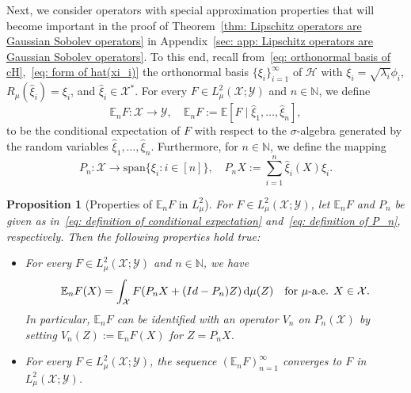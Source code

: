 \documentclass[namedate,webpdf]{ima-authoring-template-blank}
\newcommand*{\spn}{\mathrm{span}}
\def\D{\,\mathrm{d}}
\newcounter{counter}
\numberwithin{counter}{section}
\numberwithin{equation}{section}
\theoremstyle{plain}
\newtheorem{proposition}[counter]{Proposition}
\theoremstyle{definition}
\newcommand*{\cH}{\mathcal{H}}
\newcommand*{\cX}{\mathcal{X}}
\newcommand*{\cY}{\mathcal{Y}}
\newcommand*{\bbE}{\mathbb{E}}
\newcommand*{\bbN}{\mathbb{N}}
\theoremstyle{thmstyletwo}
\begin{document}
Next, we consider operators with special approximation properties that will become important in the proof of Theorem~\ref{thm: Lipschitz operators are Gaussian Sobolev operators} in Appendix~\ref{sec: app: Lipschitz operators are Gaussian Sobolev operators}. To this end, recall from~\eqref{eq: orthonormal basis of cH},~\eqref{eq: form of hat(xi_i)} the orthonormal basis \(\{\xi_i\}_{i=1}^{\infty}\) of \(\cH\) with \(\xi_i = \sqrt{\lambda_i} \phi_i\), \(R_{\mu} (\hat{\xi}_i) = \xi_i\), and \(\hat{\xi}_i \in \cX^*\). For every \(F \in L_{\mu}^2(\cX; \cY)\) and \(n \in \bbN\), we define 
\begin{equation}\label{eq: definition of conditional expectation}
    \bbE_n F : \cX \to \cY, \quad 
    \bbE_n F := \bbE [F \mid \hat{\xi}_1, \dots, \hat{\xi}_n] ,
\end{equation}
to be the conditional expectation of \(F\) with respect to the \(\sigma\)-algebra generated by the random variables \(\hat{\xi}_1,\dots,\hat{\xi}_n\). Furthermore, for \(n \in \bbN\), we define the mapping
\begin{equation}\label{eq: definition of P_n}
    P_n: \cX \to \spn\{\xi_i: i \in [n]\}, \quad 
    P_n X := \sum_{i = 1}^n \hat{\xi}_i(X) \xi_i.
\end{equation}

\begin{proposition}[Properties of \(\bbE_n F\) in \(L_{\mu}^2\)]
\label{prop: properties of conditional expectation in L2}
    For \(F \in L_{\mu}^2(\cX; \cY)\), let \(\bbE_n F\) and \(P_n\) be given as in~\eqref{eq: definition of conditional expectation} and~\eqref{eq: definition of P_n}, respectively. Then the following properties hold true:
    \begin{itemize}
        \item [(i)] For every \(F \in L_{\mu}^2(\cX; \cY)\) and \(n \in \bbN\), we have
        \[
        \bbE_n F(X) = \int_{\cX} F(P_n X + (\textup{Id} - P_n)Z) \D \mu(Z) \quad \text{for } \mu \text{-a.e. } X \in \cX.
        \]
        In particular, \(\bbE_n F\) can be identified with an operator \(V_n\) on \(P_n(\cX)\) by setting \(V_n(Z) := \bbE_n F(X)\) for \(Z = P_n X\).
    
        \item [(ii)] For every \(F \in L_{\mu}^2(\cX; \cY)\), the sequence \((\bbE_n F)_{n = 1}^{\infty}\) converges to \(F\) in \(L_{\mu}^2(\cX; \cY)\).
    \end{itemize}
\end{proposition}
\end{document}
